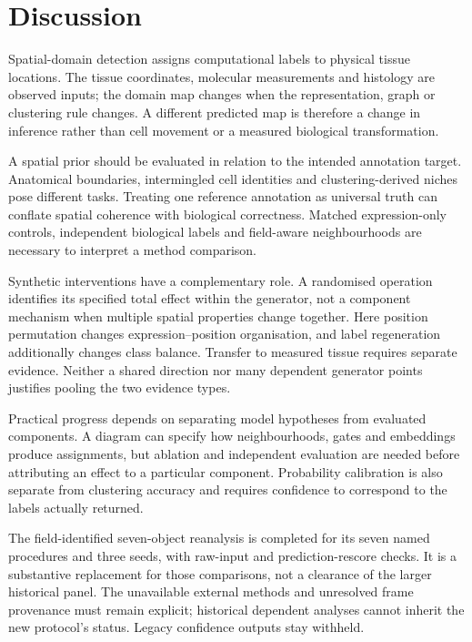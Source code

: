 \documentclass[journal]{IEEEtran}
\begin{document}
\section{Discussion}
Spatial-domain detection assigns computational labels to physical tissue locations. The tissue coordinates, molecular measurements and histology are observed inputs; the domain map changes when the representation, graph or clustering rule changes. A different predicted map is therefore a change in inference rather than cell movement or a measured biological transformation.

A spatial prior should be evaluated in relation to the intended annotation target. Anatomical boundaries, intermingled cell identities and clustering-derived niches pose different tasks. Treating one reference annotation as universal truth can conflate spatial coherence with biological correctness. Matched expression-only controls, independent biological labels and field-aware neighbourhoods are necessary to interpret a method comparison.

Synthetic interventions have a complementary role. A randomised operation identifies its specified total effect within the generator, not a component mechanism when multiple spatial properties change together. Here position permutation changes expression--position organisation, and label regeneration additionally changes class balance. Transfer to measured tissue requires separate evidence. Neither a shared direction nor many dependent generator points justifies pooling the two evidence types.

Practical progress depends on separating model hypotheses from evaluated components. A diagram can specify how neighbourhoods, gates and embeddings produce assignments, but ablation and independent evaluation are needed before attributing an effect to a particular component. Probability calibration is also separate from clustering accuracy and requires confidence to correspond to the labels actually returned.

\noindent
The field-identified seven-object reanalysis is completed for its seven named procedures and three seeds, with raw-input and prediction-rescore checks. It is a substantive replacement for those comparisons, not a clearance of the larger historical panel. The unavailable external methods and unresolved frame provenance must remain explicit; historical dependent analyses cannot inherit the new protocol's status. Legacy confidence outputs stay withheld.
\end{document}
